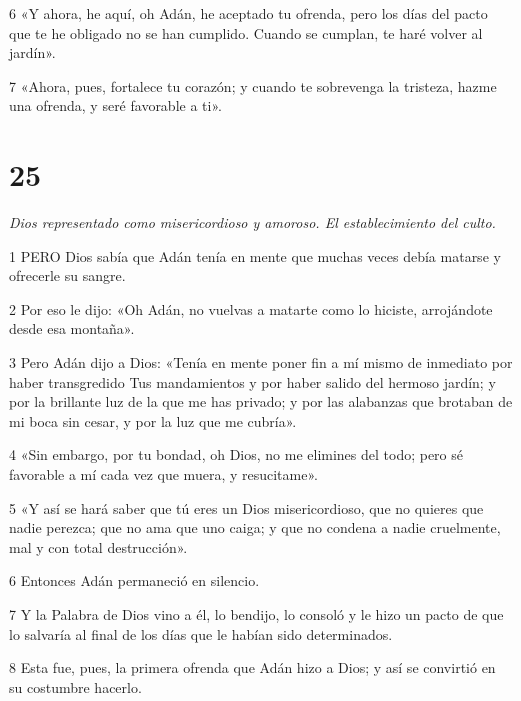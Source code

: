 \par 6 «Y ahora, he aquí, oh Adán, he aceptado tu ofrenda, pero los días del pacto que te he obligado no se han cumplido. Cuando se cumplan, te haré volver al jardín».

\par 7 «Ahora, pues, fortalece tu corazón; y cuando te sobrevenga la tristeza, hazme una ofrenda, y seré favorable a ti».

\chapter{25}

\par \textit{Dios representado como misericordioso y amoroso. El establecimiento del culto.}

\par 1 PERO Dios sabía que Adán tenía en mente que muchas veces debía matarse y ofrecerle su sangre.

\par 2 Por eso le dijo: «Oh Adán, no vuelvas a matarte como lo hiciste, arrojándote desde esa montaña».

\par 3 Pero Adán dijo a Dios: «Tenía en mente poner fin a mí mismo de inmediato por haber transgredido Tus mandamientos y por haber salido del hermoso jardín; y por la brillante luz de la que me has privado; y por las alabanzas que brotaban de mi boca sin cesar, y por la luz que me cubría».

\par 4 «Sin embargo, por tu bondad, oh Dios, no me elimines del todo; pero sé favorable a mí cada vez que muera, y resucitame».

\par 5 «Y así se hará saber que tú eres un Dios misericordioso, que no quieres que nadie perezca; que no ama que uno caiga; y que no condena a nadie cruelmente, mal y con total destrucción».

\par 6 Entonces Adán permaneció en silencio.

\par 7 Y la Palabra de Dios vino a él, lo bendijo, lo consoló y le hizo un pacto de que lo salvaría al final de los días que le habían sido determinados.

\par 8 Esta fue, pues, la primera ofrenda que Adán hizo a Dios; y así se convirtió en su costumbre hacerlo.

